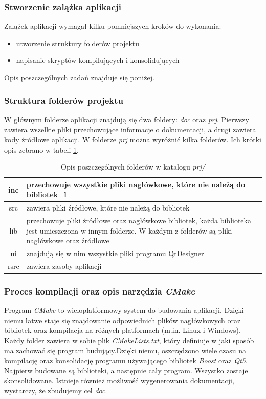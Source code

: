\documentclass[a4paper]{article}
\begin{document}
\subsubsection{Stworzenie zalążka aplikacji}

Zalążek aplikacji wymagał kilku pomniejszych kroków do wykonania:
\begin{itemize}
	\item utworzenie struktury folderów projektu
	\item napisanie skryptów kompilujących i konsolidujących
\end{itemize}
Opis poszczególnych zadań znajduje się poniżej.

\subsubsection{Struktura folderów projektu}
W głównym folderze aplikacji znajdują się dwa foldery: \textit{doc} oraz \textit{prj}. Pierwszy zawiera wszelkie pliki przechowujące informacje o dokumentacji, a drugi zawiera kody źródłowe aplikacji. W folderze \textit{prj} można wyróżnić kilka folderów. Ich krótki opis zebrano w tabeli \ref{opis_folderow_prj}.

\begin{table}
\centering
\begin{tabularx}{0.7\linewidth}{|c|X|}
	\hline
	inc & przechowuje wszystkie pliki nagłówkowe, które nie należą do bibliotek\_l \\ \hline
	src & zawiera pliki źródłowe, które nie należą do bibliotek \\ \hline
	lib & przechowuje pliki źródłowe oraz nagłówkowe bibliotek, każda biblioteka jest umieszczona 
		  w innym folderze. W każdym z folderów są pliki nagłówkowe oraz źródłowe \\ \hline
	ui & znajdują się w nim wszystkie pliki  programu QtDesigner \\ \hline
	rsrc  & zawiera zasoby aplikacji \\ \hline
\end{tabularx}
\caption{Opis poszczególnych folderów w katalogu \textit{prj/}}
\label{opis_folderow_prj}
\end{table}

\subsubsection{Proces kompilacji oraz opis narzędzia \textit{CMake}}
Program \textit{CMake} to wieloplatformowy system do budowania aplikacji. Dzięki niemu łatwe staje się
znajdowanie odpowiednich plików nagłówkowych oraz bibliotek oraz kompilacja na różnych platformach (m.in. Linux i Windows). Każdy folder zawiera w sobie plik \textit{CMakeLists.txt}, który definiuje w jaki sposób ma zachować się program budujący.Dzięki niemu, oszczędzono wiele czasu na kompilację oraz konsolidację programu używającego bibliotek \textit{Boost} oraz \textit{Qt5}. Najpierw budowane są biblioteki, a następnie cały program. Wszystko zostaje skonsolidowane. Istnieje również możliwość wygenerowania dokumentacji, wystarczy, że zbudujemy cel \textit{doc}.
\end{document}
